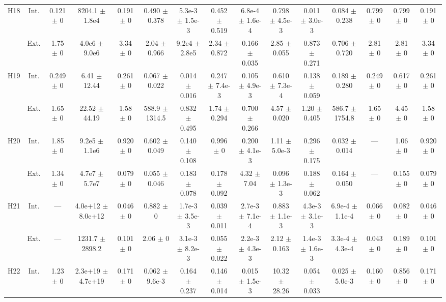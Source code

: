 \begin{table}[htbp]
{\begin{tabular}{@{}ccccccccccccccc@{}}
\cline{2-15}
\multirow{2}{*}{H18} & Int. & 0.121 $\pm$ 0 & 8204.1 $\pm$ 1.8e4 & 0.191 $\pm$ 0 & 0.490 $\pm$ 0.378 & 5.3e-3 $\pm$ 1.5e-3 & 0.452 $\pm$ 0.519 & 6.8e-4 $\pm$ 1.6e-4 & 0.798 $\pm$ 4.5e-3 & 0.011 $\pm$ 3.0e-3 & 0.084 $\pm$ 0.238 & 0.799 $\pm$ 0 & 0.799 $\pm$ 0 & 0.191 $\pm$ 0 \\
 & Ext. & 1.75 $\pm$ 0 & 4.0e6 $\pm$ 9.0e6 & 3.34 $\pm$ 0 & 2.04 $\pm$ 0.966 & 9.2e4 $\pm$ 2.8e5 & 2.34 $\pm$ 0.872 & 0.166 $\pm$ 0.035 & 2.85 $\pm$ 0.055 & 0.873 $\pm$ 0.271 & 0.706 $\pm$ 0.720 & 2.81 $\pm$ 0 & 2.81 $\pm$ 0 & 3.34 $\pm$ 0 \\
\cline{2-15}
\multirow{2}{*}{H19} & Int. & 0.249 $\pm$ 0 & 6.41 $\pm$ 12.44 & 0.261 $\pm$ 0 & 0.067 $\pm$ 0.022 & 0.014 $\pm$ 0.016 & 0.247 $\pm$ 7.4e-3 & 0.105 $\pm$ 4.9e-3 & 0.610 $\pm$ 7.3e-4 & 0.138 $\pm$ 0.059 & 0.189 $\pm$ 0.280 & 0.249 $\pm$ 0 & 0.617 $\pm$ 0 & 0.261 $\pm$ 0 \\
 & Ext. & 1.65 $\pm$ 0 & 22.52 $\pm$ 44.19 & 1.58 $\pm$ 0 & 588.9 $\pm$ 1314.5 & 0.832 $\pm$ 0.495 & 1.74 $\pm$ 0.294 & 0.700 $\pm$ 0.266 & 4.57 $\pm$ 0.020 & 1.20 $\pm$ 0.405 & 586.7 $\pm$ 1754.8 & 1.65 $\pm$ 0 & 4.45 $\pm$ 0 & 1.58 $\pm$ 0 \\
\cline{2-15}
\multirow{2}{*}{H20} & Int. & 1.85 $\pm$ 0 & 9.2e5 $\pm$ 1.1e6 & 0.920 $\pm$ 0 & 0.602 $\pm$ 0.049 & 0.140 $\pm$ 0.108 & 0.996 $\pm$ 0 & 0.200 $\pm$ 4.1e-3 & 1.11 $\pm$ 5.0e-3 & 0.296 $\pm$ 0.175 & 0.032 $\pm$ 0.014 & --- & 1.06 $\pm$ 0 & 0.920 $\pm$ 0 \\
 & Ext. & 1.34 $\pm$ 0 & 4.7e7 $\pm$ 5.7e7 & 0.079 $\pm$ 0 & 0.055 $\pm$ 0.046 & 0.183 $\pm$ 0.078 & 0.178 $\pm$ 0.092 & 4.32 $\pm$ 7.04 & 0.096 $\pm$ 1.3e-3 & 0.188 $\pm$ 0.062 & 0.164 $\pm$ 0.050 & --- & 0.155 $\pm$ 0 & 0.079 $\pm$ 0 \\
\cline{2-15}
\multirow{2}{*}{H21} & Int. & --- & 4.0e+12 $\pm$ 8.0e+12 & 0.046 $\pm$ 0 & 0.882 $\pm$ 0 & 1.7e-3 $\pm$ 3.5e-3 & 0.039 $\pm$ 0.011 & 2.7e-3 $\pm$ 7.1e-4 & 0.883 $\pm$ 1.1e-3 & 4.3e-3 $\pm$ 3.1e-3 & 6.9e-4 $\pm$ 1.1e-4 & 0.066 $\pm$ 0 & 0.082 $\pm$ 0 & 0.046 $\pm$ 0 \\
 & Ext. & --- & 1231.7 $\pm$ 2898.2 & 0.101 $\pm$ 0 & 2.06 $\pm$ 0 & 3.1e-3 $\pm$ 8.2e-3 & 0.055 $\pm$ 0.022 & 2.2e-3 $\pm$ 4.3e-3 & 2.12 $\pm$ 0.163 & 1.4e-3 $\pm$ 1.6e-3 & 3.3e-4 $\pm$ 4.3e-4 & 0.043 $\pm$ 0 & 0.189 $\pm$ 0 & 0.101 $\pm$ 0 \\
\cline{2-15}
\multirow{2}{*}{H22} & Int. & 1.23 $\pm$ 0 & 2.3e+19 $\pm$ 4.7e+19 & 0.171 $\pm$ 0 & 0.062 $\pm$ 9.6e-3 & 0.164 $\pm$ 0.237 & 0.146 $\pm$ 0.014 & 0.015 $\pm$ 1.5e-3 & 10.32 $\pm$ 28.26 & 0.054 $\pm$ 0.033 & 0.025 $\pm$ 5.0e-3 & 0.160 $\pm$ 0 & 0.856 $\pm$ 0 & 0.171 $\pm$ 0 \\

\end{tabular}}
\end{table}
